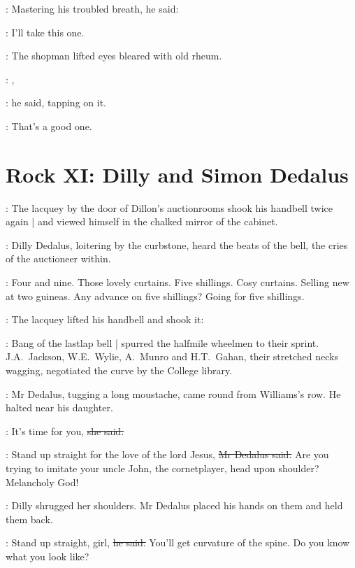 :
Mastering his troubled breath,
he said:

\Bloom:
I'll take this one.

:
The shopman lifted eyes
bleared with old rheum.

\shopman:
,

:
he said,
tapping on it.

\shopman:
That's a good one.


\section*{Rock XI: Dilly and Simon Dedalus}


:
The lacquey by the door of Dillon's auctionrooms
shook his handbell
twice again |
and viewed himself in the chalked mirror of the cabinet.

:
Dilly Dedalus,
loitering by the curbstone,
heard the beats of the bell,
the cries of the auctioneer within.

\auctioneer:
Four and nine.
Those lovely curtains.
Five shillings.
Cosy curtains.
Selling new at two guineas.
Any advance on five shillings?
Going for five shillings.

:
The lacquey lifted his handbell and shook it:

%

\begin{interject}
    :
    Bang of the lastlap bell |
    spurred the halfmile wheelmen to their sprint.
    J.A.~Jackson,
    W.E.~Wylie,
    A.~Munro
    and H.T.~Gahan,
    their stretched necks wagging,
    negotiated the curve by the College library.
\end{interject}

:
Mr Dedalus,
tugging a long moustache,
came round from Williams's row.
He halted near his daughter.

\dilly:
It's time for you,
\sout{she said.}

\simon:
Stand up straight for the love of the lord Jesus,
\sout{Mr Dedalus said.}
Are you trying to imitate your uncle John,
the cornetplayer,
head upon shoulder?
Melancholy God!

:
Dilly shrugged her shoulders.
Mr Dedalus placed his hands on them
and held them back.

\simon:
Stand up straight, girl,
\sout{he said.}
You'll get curvature of the spine.
Do you know what you look like?

